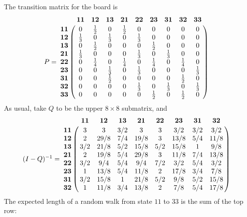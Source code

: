 \documentclass[8pt,notitlepage,twocolumn]{report}
\newenvironment{solution}[1][Solution]{\begin{trivlist}
    \item[\hskip \labelsep {\bfseries #1}]}{\end{trivlist}}
\begin{document}
\begin{solution}
The transition matrix for the board is
\small
\begin{equation}
 P = 
 \bordermatrix{
	& \mathbf{11} & \mathbf{12} & \mathbf{13} & \mathbf{21} & \mathbf{22} & \mathbf{23} & \mathbf{31} & \mathbf{32} & \mathbf{33} \cr
\mathbf{11} & 	0	& \frac{1}{2}	& 0 	& \frac{1}{2} & 0 & 0 & 0 & 0 & 0	\cr
\mathbf{12} & \frac{1}{3} & 0 & \frac{1}{3} & 0 & \frac{1}{3} & 0 & 0 & 0 & 0		\cr
\mathbf{13} & 0 & \frac{1}{2} & 0 & 0 & 0 & \frac{1}{2} & 0 & 0 & 0			\cr
\mathbf{21} & \frac{1}{3} & 0 & 0 & 0 & \frac{1}{3} & 0 & \frac{1}{3} & 0 & 0		\cr
\mathbf{22} & 0 & \frac{1}{4} & 0 & \frac{1}{4} & 0 & \frac{1}{4} & 0 & \frac{1}{4} & 0 \cr
\mathbf{23} & 0 & 0 & \frac{1}{3} & 0 & \frac{1}{3} & 0 & 0 & 0 & \frac{1}{3}		\cr
\mathbf{31} & 0 & 0 & \frac{1}{2} & 0 & 0 & 0 & 0 & \frac{1}{2} & 0			\cr
\mathbf{32} & 0 & 0 & 0 & 0 & \frac{1}{3} & 0 & \frac{1}{3} & 0 & \frac{1}{3}		\cr
\mathbf{33} & 0 & 0 & 0 & 0 & 0 & \frac{1}{2} & 0 & \frac{1}{2} & 0
 }
\end{equation}
\normalsize
As usual, take $Q$ to be the upper $8\times8$ submatrix, and
\scriptsize
\begin{equation}
 (I-Q)^{-1} = 
 \bordermatrix{
& \mathbf{11} & \mathbf{12} & \mathbf{13} & \mathbf{21} & \mathbf{22} & \mathbf{23} & \mathbf{31} & \mathbf{32}\cr
\mathbf{11} & 3 & 3 & 3/2 & 3 & 3 & 3/2 & 3/2 & 3/2 		\cr
\mathbf{12} & 2 & 29/8 & 7/4 & 19/8 & 3 & 13/8 & 5/4 & 11/8 	\cr
\mathbf{13} & 3/2 & 21/8 & 5/2 & 15/8 & 5/2 & 15/8 & 1 & 9/8	\cr
\mathbf{21} & 2 & 19/8 & 5/4 & 29/8 & 3 & 11/8 & 7/4 & 13/8 	\cr
\mathbf{22} & 3/2 & 9/4 & 5/4 & 9/4 & 7/2 & 3/2 & 5/4 & 3/2	\cr
\mathbf{23} & 1   & 13/8 & 5/4 & 11/8 & 2 & 17/8 & 3/4 & 7/8	\cr
\mathbf{31} & 3/2 & 15/8 & 1   & 21/8 & 5/2 & 9/8 & 5/2 & 15/8	\cr
\mathbf{32} & 1   & 11/8 & 3/4 & 13/8 & 2 & 7/8 & 5/4 & 17/8
 }
\end{equation}
\normalsize
The expected length of a random walk from state $11$ to $33$ is the sum of the top row:


\end{solution}
\end{document}
